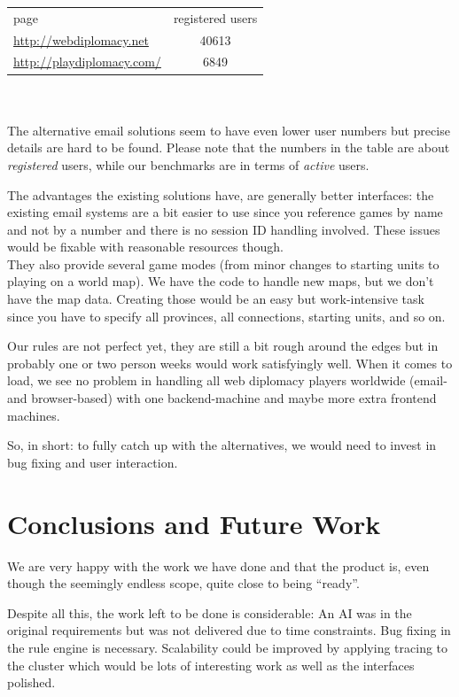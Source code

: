 \documentclass[11pt,a4paper]{report}
\begin{document}
\begin{tabular}{lc}
  page                            & registered users \\
  \url{http://webdiplomacy.net}   & 40613 \\
  \url{http://playdiplomacy.com/} & 6849
\end{tabular}
\\
\\The alternative email solutions seem to have even lower user numbers but
precise details are hard to be found. Please note that the numbers in
the table are about {\em registered\/} users, while our benchmarks are in terms
of {\em active\/} users.

The advantages the existing solutions have, are generally better interfaces:
the existing email systems are a bit easier to use since you reference games by
name and not by a number and there is no session ID handling involved.
These issues would be fixable with reasonable resources though. \\
They also provide several game modes (from minor changes to starting units to
playing on a world map). We have the code to handle new maps, but we don't have
the map data. Creating those would be an easy but work-intensive task since
you have to specify all provinces, all connections, starting units, and so on.

Our rules are not perfect yet, they are still a bit rough around the edges but
in probably one or two person weeks would work satisfyingly well.
When it comes to load, we see no problem in handling all web diplomacy
players worldwide (email- and browser-based) with one backend-machine and maybe
more extra frontend machines.

So, in short: to fully catch up with the alternatives, we would need to invest
in bug fixing and user interaction.

\chapter{Conclusions and Future Work}
We are very happy with the work we have done and that the product is, even
though the seemingly endless scope, quite close to being ``ready''.

Despite all this, the work left to be done is considerable:
An AI was in the original requirements but was not delivered due to time
constraints.
Bug fixing in the rule engine is necessary. Scalability could be improved by
applying tracing to the cluster which would be lots of interesting work as well
as the interfaces polished.
\end{document}
